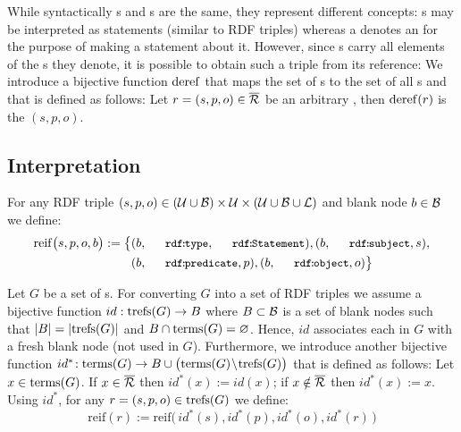 While syntactically {\RDFplusTriple}s and {\TRef}s are the same, they represent different concepts: {\RDFplusTriple}s may be interpreted as statements (similar to RDF triples) whereas a {\TRef} denotes an {\RDFplusTriple}
	for the purpose of making a statement about it.
%
However, since {\TRef}s carry all elements of the {\RDFplusTriple}s they denote, it is possible to obtain such a triple from its reference: We introduce a bijective function $\mathrm{deref}$ that maps the set of {\TRef}s to the set of all {\RDFplusTriple}s and that is defined as follows: Let $r=(s,p,o) \in \overline{\mathcal{R}}$ be an arbitrary {\TRef}, then $\mathrm{deref}(r)$ is the {\RDFplusTriple} $(s,p,o)$.

\subsection{Interpretation}


For any RDF triple $(s,p,o) \in (\mathcal{U} \cup \mathcal{B}) \times \mathcal{U} \times (\mathcal{U} \cup \mathcal{B} \cup \mathcal{L})$ and blank node $b \in \mathcal{B}$ we define:
\begin{align*}
	\mathrm{reif}\bigl( s,p,o, b \bigr) := \big\lbrace
		& (b,\mathTinyRDF{rdf\!:\!type},\mathTinyRDF{rdf\!:\!Statement}),
		(b,\mathTinyRDF{rdf\!:\!subject},s), \\
		& (b,\mathTinyRDF{rdf\!:\!predicate},p),
		(b,\mathTinyRDF{rdf\!:\!object},o)
	\big\rbrace
\end{align*}

\noindent
Let $G$ be a set of {\RDFplusTriple}s. For converting $G$ into a set of RDF triples we assume a bijective function $id : \mathrm{trefs}(G) \rightarrow B$ where $B \subset \mathcal{B}$ is a set of blank nodes such that $| B | = | \mathrm{trefs}(G) |$ and $B \cap \mathrm{terms}(G) = \varnothing$. Hence, $id$ associates each {\TRef} in $G$ with a fresh blank node (not used in $G$). Furthermore, we introduce
	another bijective function $id^*\! : \mathrm{terms}(G) \rightarrow B \cup \bigl( \mathrm{terms}(G) \!\setminus\! \mathrm{trefs}(G) \bigr)$
that is defined as follows: Let $x \in \mathrm{terms}(G)$. If $x \in \overline{\mathcal{R}}$ then $id^*\!(x) := id(x)$; if $x \notin \overline{\mathcal{R}}$ then $id^*\!(x) := x$.
%
	Using $id^*$,
for any {\TRef} $r = (s,p,o) \in \mathrm{trefs}(G)$ we define:
\begin{equation*}
	\mathrm{reif}( r ) := \mathrm{reif}\bigl( \, id^*\!(s), id^*\!(p), id^*\!(o), id^*\!(r) \, \bigr)
\end{equation*}


